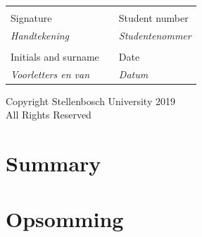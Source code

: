 \documentclass[12pt,a4paper]{report}
\begin{document}
\vspace{1cm}
\begin{table}[ht]
	\begin{center}
		\begin{tabular*}{15.5cm}{@{\extracolsep{\fill}}lll}
			\makebox[8cm]{\hrulefill} & & \makebox[6cm]{\hrulefill}\\
			Signature & & Student number \\
			\textit{Handtekening} & & \textit{Studentenommer} \\[1cm]
		    \makebox[8cm]{\hrulefill} & & \makebox[6cm]{\hrulefill}\\ 
			Initials and surname & & Date \\
			\textit{Voorletters en van} & & \textit{Datum}\\
		\end{tabular*}
	\end{center}
\end{table}

\vfill

\begin{center}
	Copyright \textcopyright \space Stellenbosch University 2019\\
	All Rights Reserved
\end{center}

\newpage

\section*{Summary}
\section*{Opsomming}


\newpage

\tableofcontents
\listoffigures
\listoftables
\printacronyms[name={List of Abbreviations}]
\newpage

\end{document}
